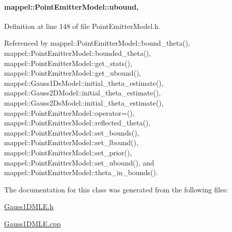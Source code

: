 \paragraph[{\texorpdfstring{ubound}{ubound}}]{ mappel\+::\+Point\+Emitter\+Model\+::ubound\hspace{0.3cm}{\ttfamily [protected]}, {\ttfamily [inherited]}}\hypertarget{classmappel_1_1PointEmitterModel_a35b883e84b6a2e0093bdf482c623beef}{}\label{classmappel_1_1PointEmitterModel_a35b883e84b6a2e0093bdf482c623beef}


Definition at line 148 of file Point\+Emitter\+Model.\+h.



Referenced by mappel\+::\+Point\+Emitter\+Model\+::bound\+\_\+theta(), mappel\+::\+Point\+Emitter\+Model\+::bounded\+\_\+theta(), mappel\+::\+Point\+Emitter\+Model\+::get\+\_\+stats(), mappel\+::\+Point\+Emitter\+Model\+::get\+\_\+ubound(), mappel\+::\+Gauss1\+Ds\+Model\+::initial\+\_\+theta\+\_\+estimate(), mappel\+::\+Gauss2\+D\+Model\+::initial\+\_\+theta\+\_\+estimate(), mappel\+::\+Gauss2\+Ds\+Model\+::initial\+\_\+theta\+\_\+estimate(), mappel\+::\+Point\+Emitter\+Model\+::operator=(), mappel\+::\+Point\+Emitter\+Model\+::reflected\+\_\+theta(), mappel\+::\+Point\+Emitter\+Model\+::set\+\_\+bounds(), mappel\+::\+Point\+Emitter\+Model\+::set\+\_\+lbound(), mappel\+::\+Point\+Emitter\+Model\+::set\+\_\+prior(), mappel\+::\+Point\+Emitter\+Model\+::set\+\_\+ubound(), and mappel\+::\+Point\+Emitter\+Model\+::theta\+\_\+in\+\_\+bounds().



The documentation for this class was generated from the following files\+:\begin{DoxyCompactItemize}
\item 
\hyperlink{Gauss1DMLE_8h}{Gauss1\+D\+M\+L\+E.\+h}\item 
\hyperlink{Gauss1DMLE_8cpp}{Gauss1\+D\+M\+L\+E.\+cpp}\end{DoxyCompactItemize}
